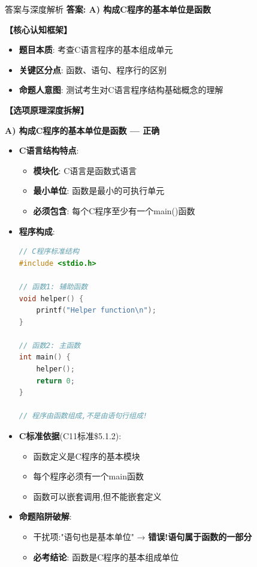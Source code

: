 \documentclass[a4paper,12pt]{article}
\begin{document}
\begin{bluebox}{答案与深度解析}
	\textbf{答案: A) 构成C程序的基本单位是函数}

	\textbf{【核心认知框架】}
	\begin{itemize}[leftmargin=*, nosep]
		\item \textbf{题目本质}: 考查C语言程序的基本组成单元
		\item \textbf{关键区分点}: 函数、语句、程序行的区别
		\item \textbf{命题人意图}: 测试考生对C语言程序结构基础概念的理解
	\end{itemize}

	\textbf{【选项原理深度拆解】}

	\textbf{A) 构成C程序的基本单位是函数 — 正确}
	\begin{itemize}[leftmargin=*, nosep]
		\item \textbf{C语言结构特点}:
		      \begin{itemize}
			      \item \textbf{模块化}: C语言是函数式语言
			      \item \textbf{最小单位}: 函数是最小的可执行单元
			      \item \textbf{必须包含}: 每个C程序至少有一个main()函数
		      \end{itemize}

		\item \textbf{程序构成}:
		      \begin{lstlisting}[language=C]
// C程序标准结构
#include <stdio.h>

// 函数1: 辅助函数
void helper() {
    printf("Helper function\n");
}

// 函数2: 主函数
int main() {
    helper();
    return 0;
}

// 程序由函数组成,不是由语句行组成!
    \end{lstlisting}

		\item \textbf{C标准依据}(C11标准\$5.1.2):
		      \begin{itemize}
			      \item 函数定义是C程序的基本模块
			      \item 每个程序必须有一个main函数
			      \item 函数可以嵌套调用,但不能嵌套定义
		      \end{itemize}

		\item \textbf{命题陷阱破解}:
		      \begin{itemize}
			      \item 干扰项:"语句也是基本单位" → \textbf{错误!语句属于函数的一部分}
			      \item \textbf{必考结论}: 函数是C程序的基本组成单位
		      \end{itemize}
	\end{itemize}


\end{bluebox}
\end{document}
